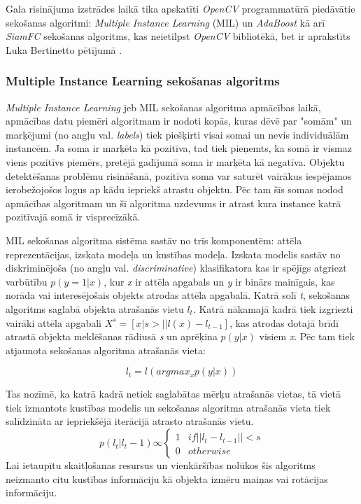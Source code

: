 Gala risinājuma izstrādes laikā tika apskatīti \textit{OpenCV} programmatūrā piedāvātie sekošanas algoritmi: \textit{Multiple Instance Learning} (MIL) \cite{babenko2009visual} un \textit{AdaBoost} \cite{grabner2006real} kā arī \textit{SiamFC} sekošanas algoritms, kas neietilpst \textit{OpenCV} bibliotēkā, bet ir aprakstīts Luka Bertinetto pētījumā \cite{bertinetto2016fully}.

\subsubsection{Multiple Instance Learning sekošanas algoritms}
\textit{Multiple Instance Learning} jeb MIL sekošanas algoritma apmācības laikā, apmācības datu piemēri algoritmam ir nodoti kopās, kuras dēvē par "somām" un marķējumi (no angļu val. \textit{labels}) tiek piešķirti visai somai un nevis individuālām instancēm. Ja soma ir marķēta kā pozitīva, tad tiek pieņemts, ka somā ir vismaz viens pozitīvs piemērs, pretējā gadījumā soma ir marķēta kā negatīva. Objektu detektēšanas problēmu risināšanā, pozitīva soma var saturēt vairākus iespējamos ierobežojošos logus ap kādu iepriekš atrastu objektu. Pēc tam šīs somas nodod apmācības algoritmam un šī algoritma uzdevums ir atrast kura instance katrā pozitīvajā somā ir visprecīzākā. 

MIL sekošanas algoritma sistēma sastāv no trīs komponentēm: attēla reprezentācijas, izskata modeļa un kustības modeļa. Izskata modelis sastāv no diskriminējoša (no angļu val. \textit{discriminative}) klasifikatora kas ir spējīgs atgriezt varbūtību $ p(y = 1|x) $, kur \textit{x} ir attēla apgabals un \textit{y} ir binārs mainīgais, kas norāda vai  interesējošais objekts atrodas attēla apgabalā. Katrā solī \textit{t}, sekošanas algoritms saglabā objekta atrašanās vietu $ l_t $. Katrā nākamajā kadrā tiek izgriezti vairāki attēla apgabali $ X^s = [x|s > ||  l(x) - l_{t-1}]$, kas atrodas dotajā brīdī atrastā objekta meklēšanas rādiusā \textit{s} un aprēķina $p(y|x)$ visiem \textit{x}. Pēc tam tiek atjaunota sekošanas algoritma atrašanās vieta:

\begin{equation}
l_t = l (argmax_{x} p(y|x))
\end{equation}

Tas nozīmē, ka katrā kadrā netiek saglabātas mērķu atrašanās vietas, tā vietā tiek izmantots kustības modelis un  sekošanas algoritma atrašanās vieta tiek salīdzināta ar iepriekšējā iterācijā atrasto atrašanās vietu.
\begin{equation}
p(l_t|l_t-1) \infty 
\begin{cases} 
1 & if ||l_t - l_{t-1}|| < s \\
0 & otherwise
\end{cases}
\end{equation}
Lai ietaupītu skaitļošanas resursus un vienkāršības nolūkos šis algoritms neizmanto citu kustības informāciju kā objekta izmēru maiņas vai rotācijas informāciju.

